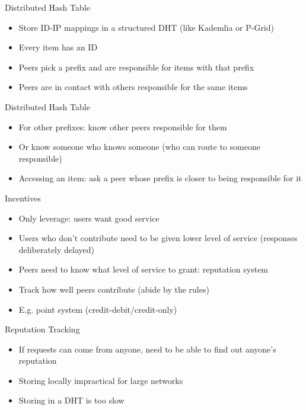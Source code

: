 \documentclass[presentation,english]{beamer}
\begin{document}
\begin{frame}{Distributed Hash Table}
  \begin{itemize}
    \item Store ID-IP mappings in a structured DHT (like Kademlia or P-Grid)
    \item Every item has an ID
    \item Peers pick a prefix and are responsible for items with that prefix
    \item Peers are in contact with others responsible for the same items
  \end{itemize}
\end{frame}

\begin{frame}{Distributed Hash Table}
  \begin{itemize}
    \item For other prefixes: know other peers responsible for them
    \item Or know someone who knows someone (who can route to someone
          responsible)
    \item Accessing an item: ask a peer whose prefix is closer to being
          responsible for it
  \end{itemize}
\end{frame}

\begin{frame}{Incentives}
  \begin{itemize}
    \item Only leverage: users want good service
    \item Users who don't contribute need to be given lower level of service
          (responses deliberately delayed)
    \item Peers need to know what level of service to grant: reputation system
    \item Track how well peers contribute (abide by the rules)
    \item E.g. point system (credit-debit/credit-only)
  \end{itemize}
\end{frame}

\begin{frame}{Reputation Tracking}
  \begin{itemize}
    \item If requests can come from anyone, need to be able to find out anyone's
          reputation
    \item Storing locally impractical for large networks
    \item Storing in a DHT is too slow
  \end{itemize}
\end{frame}
\end{document}
